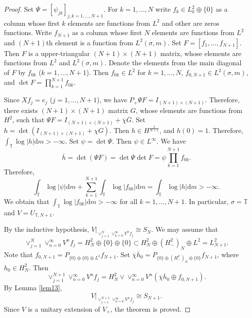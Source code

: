 \documentclass[a4paper,oneside,11pt]{amsart}
\numberwithin{equation}{section}
\theoremstyle{plain}
\theoremstyle{definition}
\begin{document}
\begin{proof}
Set $\Psi=[\psi_{jk}]_{j,k=1,\ldots, N+1}$. 
For $k=1,\ldots, N$ write $f_k\in L^2_k\oplus\{0\}$ as a column whose first $k$ elements are functions from $L^2$ and other are zeros functions. 
 Write $f_{N+1}$ as a column whose first $N$ elements are functions from $L^2$ and $(N+1)$th element is a 
function from $L^2(\sigma,m)$. Set $F=[f_1,\ldots,f_{N+1}]$.
 Then $F$ is a upper-triangular $(N+1)\times (N+1)$ matrix, 
whose elements are functions from $L^2$ and $L^2(\sigma,m)$. Denote the elements from the main diagonal of $F$ by $f_{0k}$ ($k=1,\ldots, N+1$).
Then $f_{0k}\in L^2$ for $k=1,\ldots, N$,  $f_{0,N+1}\in L^2(\sigma,m)$, and $\det F=\prod_{k=1}^{N+1}f_{0k}$.

Since $Xf_j=e_j$ ($j=1,\ldots, N+1$), we have $P_+\Psi F=I_{(N+1)\times (N+1)}$. Therefore,
 there exists $(N+1)\times (N+1)$ matrix $G$, whose elements are functions from $H^2$, such that 
$\Psi F=I_{(N+1)\times (N+1)}+\overline\chi\overline G$.
Set $h=\det(I_{(N+1)\times (N+1)}+\chi G)$. Then $h\in H^{\frac{2}{N+1}}$, and $h(0)=1$. Therefore,  
$\int_{\mathbb T}\log|h|\mathrm{d}m>-\infty$. 
Set $\psi=\det \Psi$. Then $\psi\in L^\infty$. We have 
\begin{equation*}\overline h=\det(\Psi F)=\det\Psi\det F=\psi\prod_{k=1}^{N+1}f_{0k}.
\end{equation*}
Therefore, 
\begin{equation*}
\int_{\mathbb T}\log|\psi|\mathrm{d}m+\sum_{k=1}^{N+1}\int_{\mathbb T}\log|f_{0k}|\mathrm{d}m=
\int_{\mathbb T}\log|h|\mathrm{d}m>-\infty.
\end{equation*}
We obtain that $\int_{\mathbb T}\log|f_{0k}|\mathrm{d}m>-\infty$ for all $k=1,\ldots, N+1$. In particular, $\sigma=\mathbb T$ 
and $V=U_{\mathbb T,N+1}$. 

By the inductive hypothesis, $V|_{\vee_{j=1}^N \vee_{n=0}^\infty V^n f_j}\cong S_N$. We may assume that 
\begin{equation*}\vee_{j=1}^N \vee_{n=0}^\infty V^n f_j=H^2_N\oplus\{0\}\oplus\{0\}\subset 
H^2_N\oplus (H^2_-)_N\oplus L^2=L^2_{N+1}. \end{equation*}  
Note that  $f_{0,N+1}=P_{\{0\}\oplus\{0\}\oplus L^2}f_{N+1}$. 
Set $\overline\chi\overline h_0=P_{\{0\}\oplus (H^2_-)_N\oplus\{0\}}f_{N+1}$, where $h_0\in H^2_N$.  
Then \begin{equation*}\vee_{j=1}^{N+1} \vee_{n=0}^\infty V^n f_j 
=H^2_N\vee\vee_{n=0}^\infty V^n(\overline\chi\overline h_0\oplus f_{0,N+1}).
\end{equation*}
By Lemma \ref{lem13}, \begin{equation*}V|_{\vee_{j=1}^{N+1} \vee_{n=0}^\infty V^n f_j}\cong S_{N+1}.\end{equation*}
Since $V$ is a unitary extension of $V_+$, the theorem is proved. 
\end{proof}
\end{document}
